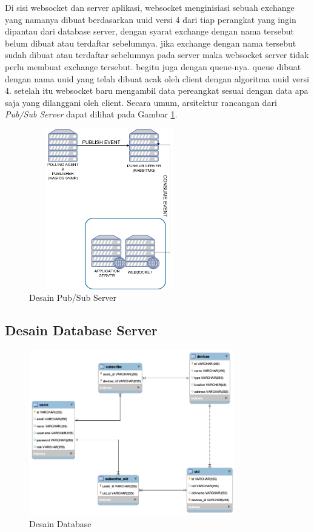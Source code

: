 			Di sisi websocket dan server aplikasi, websocket menginisiasi sebuah exchange yang namanya dibuat berdasarkan uuid versi 4 dari tiap perangkat yang ingin dipantau dari database server, dengan syarat exchange dengan nama tersebut belum dibuat atau terdaftar sebelumnya. jika exchange dengan nama tersebut sudah dibuat atau terdaftar sebelumnya pada server maka websocket server tidak perlu membuat exchange tersebut. begitu juga dengan queue-nya. queue dibuat dengan nama uuid yang telah dibuat acak oleh client dengan algoritma uuid versi 4. setelah itu websocket baru mengambil data pereangkat sesuai dengan data apa saja yang dilanggani oleh client.
        	Secara umum, arsitektur rancangan dari \textit{Pub/Sub Server} dapat dilihat pada Gambar \ref{desain:desainpubsub}.
        	\begin{figure}[H]
				\centering
				\includegraphics[width=7cm,height=7cm]{Images/C-3/desainpubsub.png}
				\caption{Desain Pub/Sub Server}
				\label{desain:desainpubsub}
			\end{figure}
            

        \subsection{Desain Database Server}
        	\begin{figure}[H]
        		\centering
        		\includegraphics[width=9cm]{Images/C-3/desaindb.png}
        		\caption{Desain Database}
        		\label{desain:desaindatabase}
        	\end{figure}
        	
